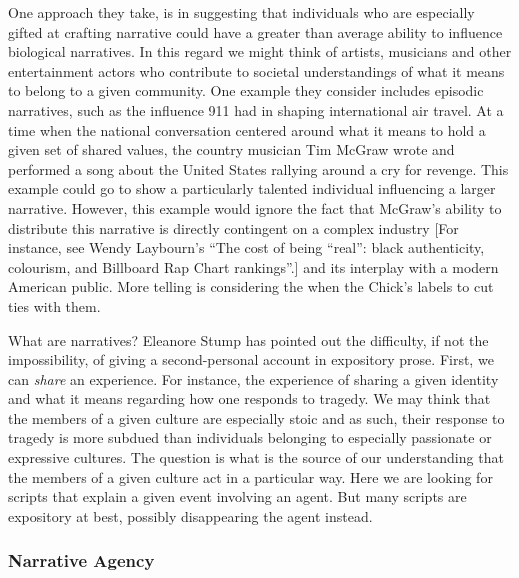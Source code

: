 \documentclass[
  letterpaper,
  DIV=11,
  numbers=noendperiod]{scrartcl}
\theoremstyle{remark}
\begin{document}
One approach they take, is in suggesting that individuals who are
especially gifted at crafting narrative could have a greater than
average ability to influence biological narratives. In this regard we
might think of artists, musicians and other entertainment actors who
contribute to societal understandings of what it means to belong to a
given community. One example they consider includes episodic narratives,
such as the influence 911 had in shaping international air travel. At a
time when the national conversation centered around what it means to
hold a given set of shared values, the country musician Tim McGraw wrote
and performed a song about the United States rallying around a cry for
revenge. This example could go to show a particularly talented
individual influencing a larger narrative. However, this example would
ignore the fact that McGraw's ability to distribute this narrative is
directly contingent on a complex industry {[}For instance, see Wendy
Laybourn's ``The cost of being ``real'': black authenticity, colourism,
and Billboard Rap Chart rankings''.{]} and its interplay with a modern
American public. More telling is considering the when the Chick's labels
to cut ties with them.

What are narratives? Eleanore Stump has pointed out the difficulty, if
not the impossibility, of giving a second-personal account in expository
prose. First, we can \emph{share} an experience. For instance, the
experience of sharing a given identity and what it means regarding how
one responds to tragedy. We may think that the members of a given
culture are especially stoic and as such, their response to tragedy is
more subdued than individuals belonging to especially passionate or
expressive cultures. The question is what is the source of our
understanding that the members of a given culture act in a particular
way. Here we are looking for scripts that explain a given event
involving an agent. But many scripts are expository at best, possibly
disappearing the agent instead.

\subsubsection{Narrative Agency}\label{narrative-agency}
\end{document}
